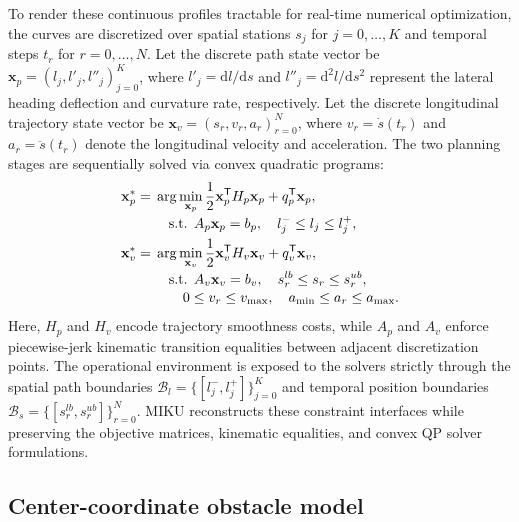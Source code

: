 To render these continuous profiles tractable for real-time numerical optimization, the curves are discretized over spatial stations $s_j$ for $j=0,\dots,K$ and temporal steps $t_r$ for $r=0,\dots,N$. Let the discrete path state vector be $\mathbf{x}_p=(l_j,l'_j,l''_j)_{j=0}^{K}$, where $l'_j = \mathrm{d}l/\mathrm{d}s$ and $l''_j = \mathrm{d}^2l/\mathrm{d}s^2$ represent the lateral heading deflection and curvature rate, respectively. Let the discrete longitudinal trajectory state vector be $\mathbf{x}_v=(s_r,v_r,a_r)_{r=0}^{N}$, where $v_r = \dot{s}(t_r)$ and $a_r = \ddot{s}(t_r)$ denote the longitudinal velocity and acceleration. The two planning stages are sequentially solved via convex quadratic programs:
\begin{align}
 \mathbf{x}_p^*={}&\arg\min_{\mathbf{x}_p}
 \frac{1}{2}\mathbf{x}_p^{\mathsf T}H_p\mathbf{x}_p+q_p^{\mathsf T}\mathbf{x}_p,\\[-2pt]
 &\quad\text{s.t. }A_p\mathbf{x}_p=b_p,\quad l_j^-\leq l_j\leq l_j^+, \label{eq:path_qp_en}\\
 \mathbf{x}_v^*={}&\arg\min_{\mathbf{x}_v}
 \frac{1}{2}\mathbf{x}_v^{\mathsf T}H_v\mathbf{x}_v+q_v^{\mathsf T}\mathbf{x}_v,\\[-2pt]
 &\quad\text{s.t. }A_v\mathbf{x}_v=b_v,\quad s_r^{lb}\leq s_r\leq s_r^{ub},\notag\\[-2pt]
 &\qquad 0\leq v_r\leq v_{\max},\quad a_{\min}\leq a_r\leq a_{\max}. \label{eq:speed_qp_en}
\end{align}
Here, $H_p$ and $H_v$ encode trajectory smoothness costs, while $A_p$ and $A_v$ enforce piecewise-jerk kinematic transition equalities between adjacent discretization points. The operational environment is exposed to the solvers strictly through the spatial path boundaries $\mathcal{B}_l=\{[l_j^-,l_j^+]\}_{j=0}^K$ and temporal position boundaries $\mathcal{B}_s=\{[s_r^{lb},s_r^{ub}]\}_{r=0}^N$. MIKU reconstructs these constraint interfaces while preserving the objective matrices, kinematic equalities, and convex QP solver formulations.

\subsection{Center-coordinate obstacle model}

